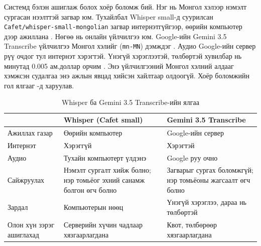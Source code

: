 Системд бэлэн ашиглаж болох хоёр боломж бий. Нэг нь Монгол хэлээр нэмэлт сургасан нээлттэй загвар юм. Тухайлбал Whisper small-д суурилсан \texttt{Cafet/\allowbreak whisper-small-\allowbreak mongolian} загвар интернэтгүйгээр, өөрийн компьютер дээр ажиллана \cite{cafet_whisper_small_mn}. Нөгөө нь онлайн үйлчилгээ юм. Google-ийн Gemini 3.5 Transcribe үйлчилгээ Монгол хэлийг (\texttt{mn-MN}) дэмждэг \cite{google_transcribe_model}. Аудио Google-ийн сервер рүү очдог тул интернэт хэрэгтэй. Үнэгүй хэрэглээтэй, төлбөртэй хувилбар нь минутад 0.005 ам.доллар орчим \cite{google_pricing}. Энэ үйлчилгээний Монгол хэлний алдааг хэмжсэн судалгаа энэ ажлын явцад хийсэн хайлтаар олдоогүй. Хоёр боломжийн гол ялгааг -д харуулав.


\begin{table}[ht]
\centering
\caption{Whisper ба Gemini 3.5 Transcribe-ийн ялгаа}
\label{tab:asr_compare}
\begin{tabular}{|p{3.6cm}|p{5.0cm}|p{5.0cm}|}
\hline
 & \textbf{Whisper (Cafet small)} & \textbf{Gemini 3.5 Transcribe} \\
\hline
Ажиллах газар & Өөрийн компьютер & Google-ийн сервер \\
\hline
Интернэт & Хэрэггүй & Хэрэгтэй \\
\hline
Аудио & Тухайн компьютерт үлдэнэ & Google руу очно \\
\hline
Сайжруулах & Нэмэлт сургалт хийж болно; нэр томьёог эхний санамж болгон өгч болно \cite{openai_whisper_repo} & Загварыг сургах боломжгүй; нэр томьёоны жагсаалт өгч болно \\
\hline
Зардал & Компьютерын нөөц & Үнэгүй хэрэглээ, дараа нь төлбөртэй \\
\hline
Олон хүн зэрэг ашиглахад & Серверийн хүчин чадлаар хязгаарлагдана & Квот, төлбөрөөр хязгаарлагдана \\
\hline
\end{tabular}
\end{table}

